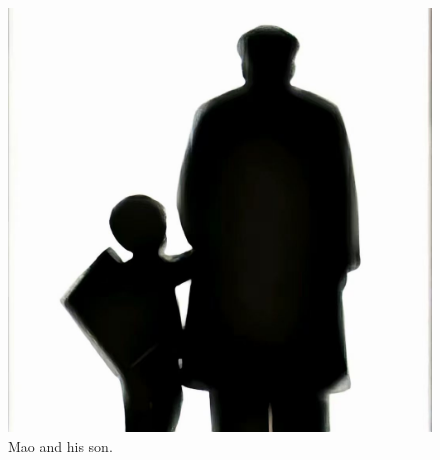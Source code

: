 \documentclass[11pt,twoside,a4paper]{book}
\theoremstyle{thmstyle} %
\theoremstyle{defstyle} %
\theoremstyle{prostyle} %
\begin{document}
\begin{figure}
  \centering
    \includegraphics[width=1.0\textwidth]{Figs/teacher.jpeg}
    \caption{Mao and his son.}
\end{figure}
\end{document}
